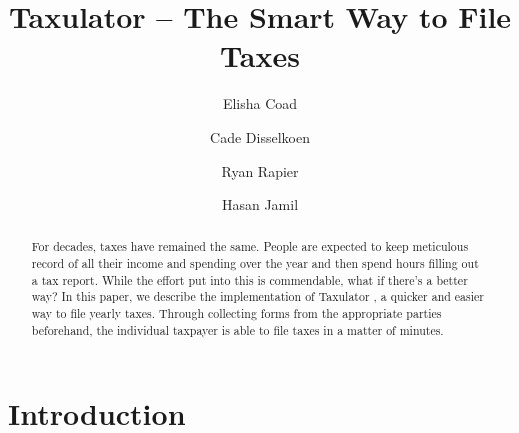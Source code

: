 \documentclass[sigconf]{acmart}
\begin{document}
\title{Taxulator – The Smart Way to File Taxes}
\pagestyle{plain}

\author{Elisha Coad}

\author{Cade Disselkoen}

\author{Ryan Rapier}

\author{Hasan Jamil}


\begin{abstract}
  For decades, taxes have remained the same. People are expected to keep meticulous record of all their income and spending over the year and then spend hours filling out a tax report. While the effort put into this is commendable, what if there’s a better way? In this paper, we describe the implementation of Taxulator \cite{TaxulatorDemo}, a quicker and easier way to file yearly taxes. Through collecting forms from the appropriate parties beforehand, the individual taxpayer is able to file taxes in a matter of minutes.
\end{abstract}



\maketitle

\section{Introduction}
\end{document}
